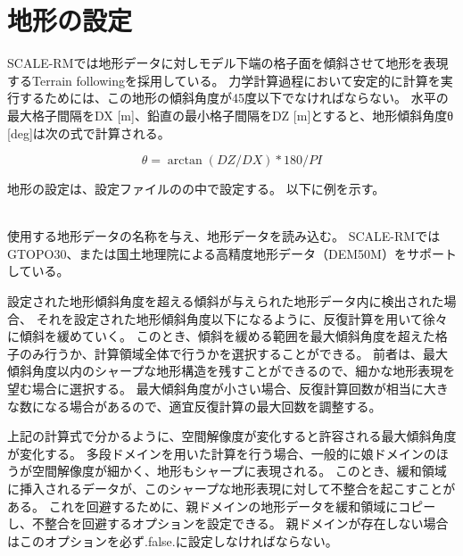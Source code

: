 \section{地形の設定} \label{chap:basic_usel_topo}

SCALE-RMでは地形データに対しモデル下端の格子面を傾斜させて地形を表現するTerrain followingを採用している。
力学計算過程において安定的に計算を実行するためには、この地形の傾斜角度が45度以下でなければならない。
水平の最大格子間隔をDX [m]、鉛直の最小格子間隔をDZ [m]とすると、地形傾斜角度θ [deg]は次の式で計算される。

\[ \theta = \arctan( DZ/DX ) * 180/PI \]

地形の設定は、設定ファイルのの中で設定する。
以下に例を示す。

\\

使用する地形データの名称を与え、地形データを読み込む。
SCALE-RMではGTOPO30、または国土地理院による高精度地形データ（DEM50M）をサポートしている。

設定された地形傾斜角度を超える傾斜が与えられた地形データ内に検出された場合、
それを設定された地形傾斜角度以下になるように、反復計算を用いて徐々に傾斜を緩めていく。
このとき、傾斜を緩める範囲を最大傾斜角度を超えた格子のみ行うか、計算領域全体で行うかを選択することができる。
前者は、最大傾斜角度以内のシャープな地形構造を残すことができるので、細かな地形表現を望む場合に選択する。
最大傾斜角度が小さい場合、反復計算回数が相当に大きな数になる場合があるので、適宜反復計算の最大回数を調整する。

上記の計算式で分かるように、空間解像度が変化すると許容される最大傾斜角度が変化する。
多段ドメインを用いた計算を行う場合、一般的に娘ドメインのほうが空間解像度が細かく、地形もシャープに表現される。
このとき、緩和領域に挿入されるデータが、このシャープな地形表現に対して不整合を起こすことがある。
これを回避するために、親ドメインの地形データを緩和領域にコピーし、不整合を回避するオプションを設定できる。
親ドメインが存在しない場合はこのオプションを必ず.false.に設定しなければならない。
